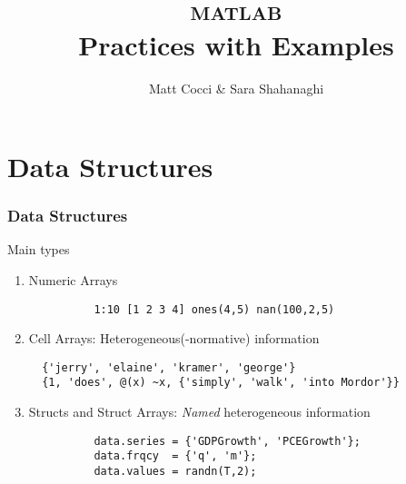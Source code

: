 \documentclass{beamer}
\begin{document}
\title{\textsc{matlab }\\ Practices with Examples}
\author{Matt Cocci \& Sara Shahanaghi}
\date{}

\frame{\titlepage}






\lstset{style=matlab}
\section{Data Structures}

  \begin{frame}[fragile]
    \frametitle{Data Structures}

    Main types
    \begin{enumerate}
      \item Numeric Arrays
        \begin{lstlisting}
          1:10 [1 2 3 4] ones(4,5) nan(100,2,5)
        \end{lstlisting}
      \item Cell Arrays: Heterogeneous(-normative) information
        \begin{lstlisting}
  {'jerry', 'elaine', 'kramer', 'george'}
  {1, 'does', @(x) ~x, {'simply', 'walk', 'into Mordor'}}
        \end{lstlisting}
      \item Structs and Struct Arrays: \emph{Named} heterogeneous
        information
        \begin{lstlisting}
          data.series = {'GDPGrowth', 'PCEGrowth'};
          data.frqcy  = {'q', 'm'};
          data.values = randn(T,2);
        \end{lstlisting}
    \end{enumerate}

	\end{frame}
\end{document}
